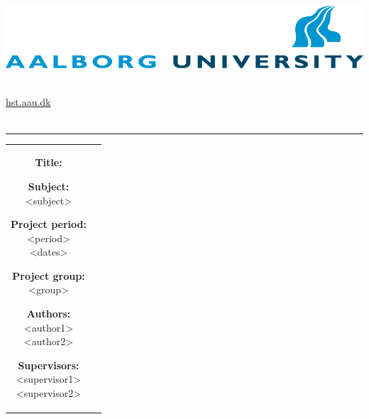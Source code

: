 	\begin{adjustwidth*}{-1.6cm}{-1cm}
		\begin{nopagebreak}
			{\samepage{}
				\parbox{14.5cm}{
					\begin{flushright}
						\includegraphics{img/aauLogoEn.png}\\
					\end{flushright}
					\vspace{0.2cm}
				  \\
				  { \href{http://hst.aau.dk/}{hst.aau.dk}}\\
				  \vspace{-0.8cm}\\
					\hrule
					\vspace{0.2cm}
				}
				
				\begin{tabular}{cc}
					\parbox{6.3cm}{
						\hspace{2cm}
						\begin{description}
							\item {\textbf{Title:}}\\
								\thetitle
							\item {\textbf{Subject:}}\\
								<subject>\\
							\item {\textbf{Project period:}}\\
							  <period>\\
							  <dates>\\
							\item {\textbf{Project group:}}\\
							  <group>
							\item {\textbf{Authors:}}\\
								<author1>\\
								<author2>\\
							\item {\textbf{Supervisors:}}\\
								<supervisor1>\\
								<supervisor2>\\
						\end{description}
						
}
\end{tabular}}
\end{nopagebreak}
\end{adjustwidth*}
